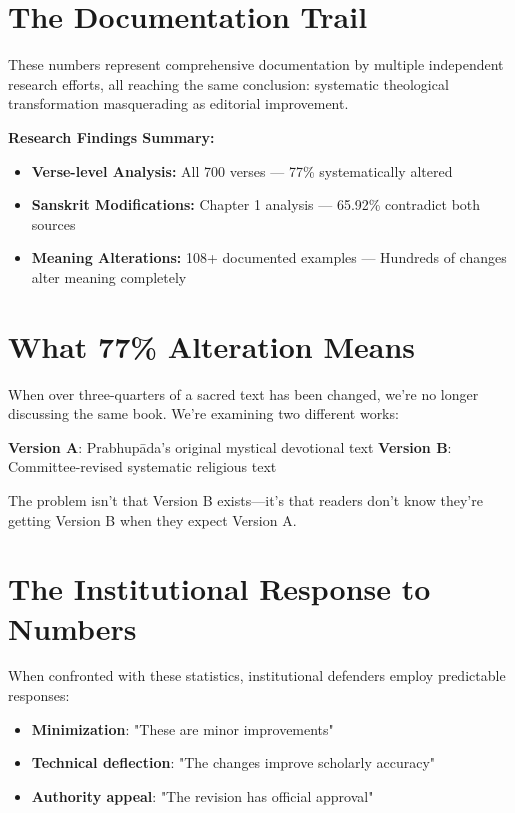 \documentclass[11pt,twoside]{book}
\begin{document}
\section*{The Documentation Trail}
\label{sec:org82ed9d2}

These numbers represent comprehensive documentation by multiple independent research efforts, all reaching the same conclusion: systematic theological transformation masquerading as editorial improvement.

\textbf{\textbf{Research Findings Summary:}}

\begin{itemize}
\item \textbf{\textbf{Verse-level Analysis:}} All 700 verses — 77\% systematically altered
\item \textbf{\textbf{Sanskrit Modifications:}} Chapter 1 analysis — 65.92\% contradict both sources
\item \textbf{\textbf{Meaning Alterations:}} 108+ documented examples — Hundreds of changes alter meaning completely
\end{itemize}
\section*{What 77\% Alteration Means}
\label{sec:org2406477}

When over three-quarters of a sacred text has been changed, we're no longer discussing the same book. We're examining two different works:

\textbf{\textbf{Version A}}: Prabhupāda's original mystical devotional text
\textbf{\textbf{Version B}}: Committee-revised systematic religious text

The problem isn't that Version B exists—it's that readers don't know they're getting Version B when they expect Version A.
\section*{The Institutional Response to Numbers}
\label{sec:org95dd320}

When confronted with these statistics, institutional defenders employ predictable responses:

\begin{itemize}
\item \textbf{\textbf{Minimization}}: "These are minor improvements"
\item \textbf{\textbf{Technical deflection}}: "The changes improve scholarly accuracy"
\item \textbf{\textbf{Authority appeal}}: "The revision has official approval"
\end{itemize}
\end{document}
